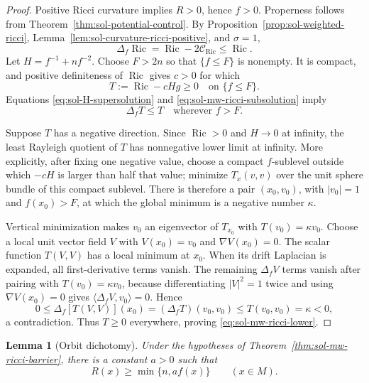\documentclass[10pt]{coll-l}
\newtheorem{lemma}[theorem]{Lemma}
\theoremstyle{definition}
\theoremstyle{remark}
\numberwithin{section}{chapter}
\numberwithin{equation}{chapter}
\newcommand{\Ric}{\operatorname{Ric}}
\begin{document}
\begin{proof}
Positive Ricci curvature implies $R>0$, hence $f>0$.  Properness follows
from Theorem~\ref{thm:sol-potential-control}.  By
Proposition~\ref{prop:sol-weighted-ricci},
Lemma~\ref{lem:sol-curvature-ricci-positive}, and $\sigma=1$,
\begin{equation}
                 \Delta_f\Ric
                    =\Ric-2\mathcal C_{\Ric}\leq\Ric.     \label{eq:sol-mw-ricci-subsolution}
\end{equation}
Let $H=f^{-1}+nf^{-2}$.  Choose $F>2n$ so that $\{f\leq F\}$ is nonempty.
It is compact, and positive definiteness of $\Ric$ gives $c>0$ for which
\begin{equation}
                 T:=\Ric-cHg\geq0
                 \quad\text{on }\{f\leq F\}.             \label{eq:sol-mw-core-tensor}
\end{equation}
Equations \eqref{eq:sol-H-supersolution} and
\eqref{eq:sol-mw-ricci-subsolution} imply
\begin{equation}
                 \Delta_fT\leq T
                 \quad\text{wherever }f>F.               \label{eq:sol-mw-tensor-inequality}
\end{equation}

Suppose $T$ has a negative direction.  Since $\Ric>0$ and $H\to0$ at
infinity, the least Rayleigh quotient of $T$ has nonnegative lower limit at
infinity.  More explicitly, after fixing one negative value, choose a
compact $f$-sublevel outside which $-cH$ is larger than half that value;
minimize $T_x(v,v)$ over the unit sphere bundle of this compact sublevel.
There is therefore a pair $(x_0,v_0)$, with $|v_0|=1$ and $f(x_0)>F$, at
which the global minimum is a negative number $\kappa$.

Vertical minimization makes $v_0$ an eigenvector of $T_{x_0}$ with
$T(v_0)=\kappa v_0$.  Choose a local unit vector field $V$ with
$V(x_0)=v_0$ and $\nabla V(x_0)=0$.  The scalar function $T(V,V)$ has a
local minimum at $x_0$.  When its drift Laplacian is expanded, all
first-derivative terms vanish.  The remaining $\Delta_fV$ terms vanish
after pairing with $T(v_0)=\kappa v_0$, because differentiating
$|V|^2=1$ twice and using $\nabla V(x_0)=0$ gives
$\langle\Delta_fV,v_0\rangle=0$.  Hence
\[
 0\leq\Delta_f[T(V,V)](x_0)
    =(\Delta_fT)(v_0,v_0)
    \leq T(v_0,v_0)=\kappa<0,
\]
a contradiction.  Thus $T\geq0$ everywhere, proving
\eqref{eq:sol-mw-ricci-lower}.
\end{proof}

\begin{lemma}[Orbit dichotomy]
\label{lem:sol-mw-orbit-dichotomy}
Under the hypotheses of Theorem~\ref{thm:sol-mw-ricci-barrier}, there is a
constant $a>0$ such that
\begin{equation}
                  R(x)\geq\min\{n,af(x)\}
                  \qquad(x\in M).                        \label{eq:sol-mw-min-dichotomy}
\end{equation}
\end{lemma}
\end{document}
